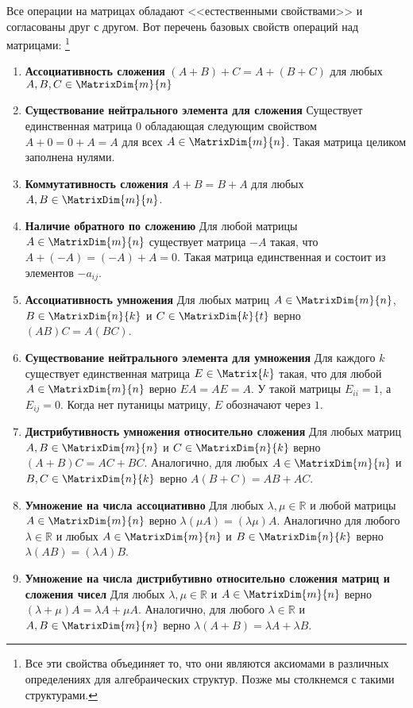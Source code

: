 Все операции на матрицах обладают <<естественными свойствами>> и согласованы друг с другом.
Вот перечень базовых свойств операций над матрицами:%
\footnote{Все эти свойства объединяет то, что они являются аксиомами в различных определениях для алгебраических структур.
Позже мы столкнемся с такими структурами.}
\begin{enumerate}
\item {\bf Ассоциативность сложения}
$(A + B) + C = A + (B + C)$ для любых $A,B,C\in \MatrixDim{m}{n}$
\item {\bf Существование нейтрального элемента для сложения}
Существует единственная матрица $0$ обладающая следующим свойством $A + 0 = 0 + A = A$ для всех $A\in\MatrixDim{m}{n}$.
Такая матрица целиком заполнена нулями.

\item {\bf Коммутативность сложения}
$A + B = B + A$ для любых $A,B\in\MatrixDim{m}{n}$.

\item {\bf Наличие обратного по сложению}
Для любой матрицы $A\in\MatrixDim{m}{n}$ существует матрица $-A$ такая, что $A + (-A) = (-A) + A = 0$.
Такая матрица единственная и состоит из элементов $-a_{ij}$.

\item {\bf Ассоциативность умножения}
Для любых матриц $A\in\MatrixDim{m}{n}$, $B\in\MatrixDim{n}{k}$ и $C\in\MatrixDim{k}{t}$ верно $(AB)C = A(BC)$.

\item {\bf Существование нейтрального элемента для умножения}
Для каждого $k$ существует единственная матрица $E\in\Matrix{k}$ такая, что для любой $A\in\MatrixDim{m}{n}$ верно $E A = A E = A$.
У такой матрицы $E_{ii} = 1$, а $E_{ij} = 0$.
Когда нет путаницы матрицу, $E$ обозначают через $1$.

\item {\bf Дистрибутивность умножения относительно сложения}
Для любых матриц $A,B\in\MatrixDim{m}{n}$ и $C\in\MatrixDim{n}{k}$ верно $(A + B)C = AC + B C$.
Аналогично, для любых $A\in\MatrixDim{m}{n}$ и $B,C\in\MatrixDim{n}{k}$ верно $A(B+C) = AB + AC$.

\item {\bf Умножение на числа ассоциативно}
Для любых $\lambda,\mu \in\mathbb R$ и любой матрицы $A\in\MatrixDim{m}{n}$ верно $\lambda(\mu A) = (\lambda \mu) A$.
Аналогично для любого $\lambda \in \mathbb R$ и любых $A\in\MatrixDim{m}{n}$ и $B\in \MatrixDim{n}{k}$ верно $\lambda(AB) = (\lambda A) B$.

\item {\bf Умножение на числа дистрибутивно относительно сложения матриц и сложения чисел}
Для любых $\lambda,\mu\in \mathbb R$ и $A\in \MatrixDim{m}{n}$ верно $(\lambda + \mu)A = \lambda A +\mu A$.
Аналогично, для любого $\lambda\in\mathbb R$ и $A,B\in\MatrixDim{m}{n}$ верно $\lambda(A+B) = \lambda A + \lambda B$.


\end{enumerate}

